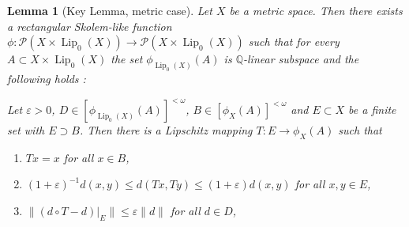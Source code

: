 \documentclass[11pt]{amsart}
\newtheorem{lemma}[thm]{Lemma}
\theoremstyle{definition}
\theoremstyle{remark}
\newcommand{\Rat}{\mathbb Q}
\newcommand{\PP}{\mathcal P}
\def \Lip {\operatorname{Lip}}
\begin{document}
\begin{lemma}[Key Lemma, metric case]\label{lem:keyLemmaMetric}
	Let $X$ be a metric space. Then there exists a rectangular Skolem-like function $\phi:\PP(X\times \Lip_0(X))\to \PP(X\times \Lip_0(X))$ such that for every $A\subset X\times \Lip_0(X)$ the set $\phi_{\Lip_0(X)}(A)$ is $\Rat$-linear subspace and the following holds :
 
    Let $\varepsilon > 0$, $D \in [\phi_{\Lip_0(X)}(A)]^{<\omega}$, $B \in [\phi_X(A)]^{<\omega}$ and $E\subset X$ be a finite set with $E \supset B$. Then there is a Lipschitz mapping $T: E \to \phi_X(A)$ such that
	\begin{enumerate}[label=\textnormal{(K'\alph*)}]
		\item\label{list:keyLemma1Metric} $Tx = x$ for all $x\in B$,
		\item\label{list:keyLemma2Metric} $(1+\varepsilon)^{-1}d(x,y) \leq d(Tx,Ty) \leq (1+\varepsilon) d(x,y)$  for all $x,y \in E$,
		\item\label{list:keyLemma3Metric}$\|(d\circ T - d)|_E\|\leq \varepsilon \|d\|$ for all $d\in D$,
	\end{enumerate}
\end{lemma}
\end{document}
